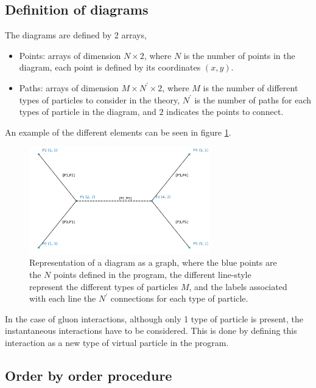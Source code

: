 \documentclass[11pt,a4paper,twoside,pdf]{article}
\numberwithin{equation}{section}
\begin{document}
\subsection{Definition of diagrams}

The diagrams are defined by 2 arrays, 
\begin{itemize}
    \item Points: arrays of dimension $N \times 2$, where $N$ is the number of 
    points in the diagram, each point is defined by its coordinates $(x,y)$.
    \item Paths: arrays of dimension $M \times N^\prime \times 2$, where $M$ is the
    number of different types of particles to consider in the theory, $N^\prime$ 
    is the number of paths for each types of particle in the diagram, and $2$ indicates
    the points to connect.
\end{itemize}

An example of the different elements can be seen in figure \ref{fig:diagram_representation}.

\begin{figure}[h!]
    \centering
    \includegraphics[width=0.7\textwidth]{plots/graph_example.png}
    \caption{Representation of a diagram as a graph, where the blue points are the $N$ points
    defined in the program, the different line-style represent the different types of particles 
    $M$, and the labels associated with each line the $N^\prime$ connections 
    for each type of particle.}
    \label{fig:diagram_representation}
\end{figure}


In the case of gluon interactions, although only 1 type of particle is present, the
instantaneous interactions have to be considered. This is done by defining this 
interaction as a new type of virtual particle in the program.

\subsection{Order by order procedure}
\end{document}
